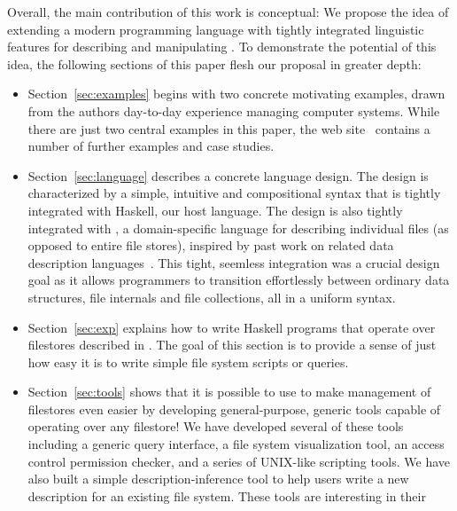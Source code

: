 Overall, the main contribution of this work is
conceptual: We propose the idea of extending a modern programming
language with tightly integrated linguistic features for
describing and manipulating \filestores{}.  To demonstrate
the potential of this idea, the following sections of this paper
flesh our proposal in greater depth:

\begin{itemize}
\item Section~\ref{sec:examples} begins with two concrete motivating 
examples, drawn from the authors day-to-day experience managing
computer systems.  While there are just two central examples in this
paper, the \forest{} web site~\cite{forest-web-site} contains a number 
of further examples and case studies.~
\item Section~\ref{sec:language} describes a concrete language design.  
The design is characterized by a simple, 
intuitive and compositional syntax that is tightly integrated with
Haskell, our host language.  The design is also tightly integrated
with \padshaskell{}, a domain-specific language for describing 
individual
files (as opposed to entire file stores), inspired by past work
on related data description languages~\cite{fisher+:pads,fisher+:popl06,mandelbaum+:pads-ml,fisher+:toplas}.
This tight, seemless integration was a crucial design goal as it
allows programmers to transition effortlessly
between ordinary \haskell{} data structures, file internals and 
file collections, all in a uniform syntax.
~
\item Section~\ref{sec:exp} explains how to write Haskell programs
that operate over filestores described in \forest.  The goal of this
section is to provide a sense of just how easy it is to write simple
file system scripts or queries.
\item Section~\ref{sec:tools} shows that it is possible to use \forest{}
to make management
of filestores even easier by developing general-purpose, generic
tools capable of operating over any filestore!  We have developed
several of these tools including a generic query interface, a file
system visualization tool, an access control permission checker, and a 
series of UNIX-like scripting tools.  We have also built a simple
description-inference tool to
help users write a new description for an existing file system.
These tools are interesting in their

\end{itemize}
